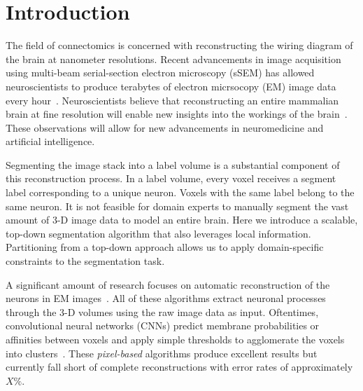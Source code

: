 \section{Introduction}

The field of connectomics is concerned with reconstructing the wiring diagram of the brain at nanometer resolutions. 
Recent advancements in image acquisition using multi-beam serial-section electron microscopy (sSEM) has allowed neuroscientists to produce terabytes of electron micrsocopy (EM) image data every hour~\cite{hildebrand2017whole}.
Neuroscientists believe that reconstructing an entire mammalian brain at fine resolution will enable new insights into the workings of the brain~\cite{kasthuri2015saturated}. 
These observations will allow for new advancements in neuromedicine and artificial intelligence. 

Segmenting the image stack into a label volume is a substantial component of this reconstruction process.
In a label volume, every voxel receives a segment label corresponding to a unique neuron. 
Voxels with the same label belong to the same neuron.
It is not feasible for domain experts to manually segment the vast amount of 3-D image data to model an entire brain.
Here we introduce a scalable, top-down segmentation algorithm that also leverages local information.
Partitioning from a top-down approach allows us to apply domain-specific constraints to the segmentation task.

A significant amount of research focuses on automatic reconstruction of the neurons in EM images~\cite{seymour2016rhoananet,nunez2014graph,parag2017anisotropic,zlateski2015image}. %
All of these algorithms extract neuronal processes through the 3-D volumes using the raw image data as input.
Oftentimes, convolutional neural networks (CNNs) predict membrane probabilities or affinities between voxels and apply simple thresholds to agglomerate the voxels into clusters~\cite{lee2015recursive,ronneberger2015u}.
These \textit{pixel-based} algorithms produce excellent results but currently fall short of complete reconstructions with error rates of approximately $X\%$. %
 
